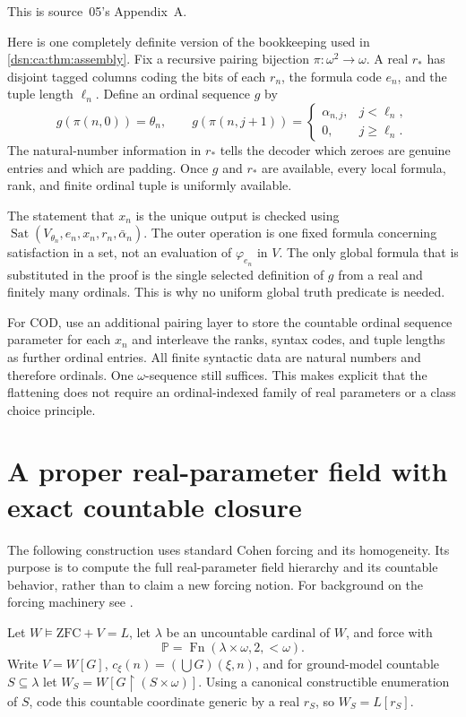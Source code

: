 \documentclass[11pt,a4paper]{article}
\numberwithin{equation}{section}
\theoremstyle{definition}
\theoremstyle{remark}
\newcommand{\Sat}{\operatorname{Sat}}
\newcommand{\COD}{\mathrm{COD}}
\begin{document}
This is source~05's Appendix~A.

Here is one completely definite version of the bookkeeping used in
\cref{dsn:ca:thm:assembly}. Fix a recursive pairing bijection
$\pi:\omega^2\to\omega$. A real $r_*$ has disjoint tagged columns
coding the bits of each $r_n$, the formula code $e_n$, and the tuple
length $\ell_n$. Define an ordinal sequence $g$ by
\[
 g(\pi(n,0))=\theta_n,\qquad
 g(\pi(n,j+1))=
 \begin{cases}
 \alpha_{n,j},&j<\ell_n,\\
 0,&j\ge\ell_n.
 \end{cases}
\]
The natural-number information in $r_*$ tells the decoder which zeroes
are genuine entries and which are padding. Once $g$ and $r_*$ are
available, every local formula, rank, and finite ordinal tuple is
uniformly available.

The statement that $x_n$ is the unique output is checked using
$\Sat(V_{\theta_n},e_n,x_n,r_n,\bar\alpha_n)$. The outer operation is
one fixed formula concerning satisfaction in a set, not an evaluation
of $\varphi_{e_n}$ in $V$. The only global formula that is substituted
in the proof is the single selected definition of $g$ from a real and
finitely many ordinals. This is why no uniform global truth predicate
is needed.

For $\COD$, use an additional pairing layer to store the countable
ordinal sequence parameter for each $x_n$ and interleave the ranks,
syntax codes, and tuple lengths as further ordinal entries. All
finite syntactic data are natural numbers and therefore ordinals.
One $\omega$-sequence still suffices. This makes explicit that the
flattening does not require an ordinal-indexed family of real
parameters or a class choice principle.

\section{A proper real-parameter field with exact countable closure}
\label{dsn:rp:sec:cohen}

The following construction uses standard Cohen forcing and its
homogeneity. Its purpose is to compute the full real-parameter field
hierarchy and its countable behavior, rather than to claim a new forcing
notion. For background on the forcing machinery see
\cite{Kunen,KaragilaForcing}.

Let $W\models\mathrm{ZFC}+V=L$, let $\lambda$ be an uncountable
cardinal of $W$, and force with
\[
 \mathbb P=\operatorname{Fn}(\lambda\times\omega,2,{<}\omega).
\]
Write $V=W[G]$, $c_\xi(n)=(\bigcup G)(\xi,n)$, and for ground-model
countable $S\subseteq\lambda$ let
$W_S=W[G\upharpoonright(S\times\omega)]$.
Using a canonical constructible enumeration of $S$, code this countable
coordinate generic by a real $r_S$, so $W_S=L[r_S]$.
\end{document}
